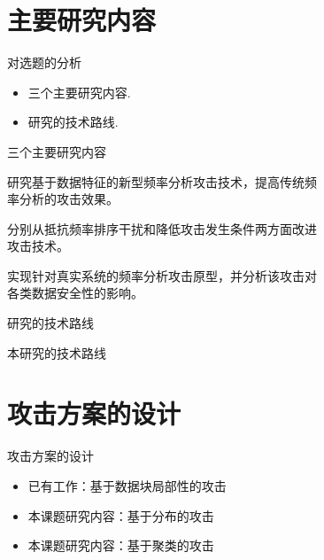 \documentclass[aspectratio=43]{beamer}
\begin{document}
\section{主要研究内容}

\begin{frame}{对选题的分析}
\begin{card}
\begin{itemize}
    \item 三个主要研究内容.
    \item 研究的技术路线.
\end{itemize}
\end{card}
\end{frame}

\begin{frame}{三个主要研究内容}
\begin{card}
研究基于数据特征的新型频率分析攻击技术，提高传统频\\[2mm]率分析的攻击效果。
\end{card}
\begin{card}
分别从抵抗频率排序干扰和降低攻击发生条件两方面改进\\[2mm]攻击技术。
\end{card}
\begin{card}
实现针对真实系统的频率分析攻击原型，并分析该攻击对\\[2mm]各类数据安全性的影响。
\end{card}
\end{frame}

\begin{frame}{研究的技术路线}
\centering
{}
\begin{card}
本研究的技术路线
\end{card}   
\end{frame}


\section{攻击方案的设计}

\begin{frame}{攻击方案的设计}
\begin{card}
\begin{itemize}
    \item 已有工作：基于数据块局部性的攻击
    \item 本课题研究内容：基于分布的攻击
    \item 本课题研究内容：基于聚类的攻击
\end{itemize}
\end{card}
\end{frame}
\end{document}
